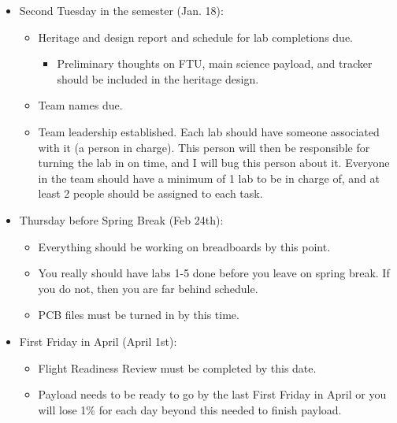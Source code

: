 \documentclass[11pt]{article}
\begin{document}
\begin{itemize}
\item Second Tuesday in the semester (Jan. 18):
  \begin{itemize}
    \item Heritage and design report and schedule for lab completions due.
      \begin{itemize}
        \item Preliminary thoughts on FTU, main science payload, and
          tracker should be included in the heritage design.
      \end{itemize}
    \item Team names due.
    \item Team leadership established.  Each lab should have someone
      associated with it (a person in charge). This person will then
      be responsible for turning the lab in on time, and I will bug
      this person about it. Everyone in the team should have a minimum
      of 1 lab to be in charge of, and at least 2 people should be
      assigned to each task.
  \end{itemize}

\item Thursday before Spring Break (Feb 24th):
  \begin{itemize}
    \item Everything should be working on breadboards by this point.
    \item You really should have labs 1-5 done before you leave on
      spring break. If you do not, then you are far behind schedule.
    \item PCB files must be turned in by this time.
  \end{itemize}

\item First Friday in April (April 1st):
  \begin{itemize}
    \item Flight Readiness Review must be completed by this date.
    \item Payload needs to be ready to go by the last First Friday in
      April or you will lose 1\% for each day beyond this needed to
      finish payload.
  \end{itemize}


\end{itemize}
\end{document}
